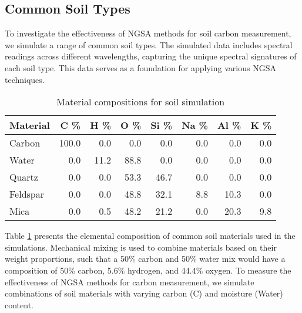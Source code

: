\subsection{Common Soil Types}

To investigate the effectiveness of NGSA methods for soil carbon measurement, we simulate a range of common soil types. The simulated data includes spectral readings across different wavelengths, capturing the unique spectral signatures of each soil type. This data serves as a foundation for applying various NGSA techniques.

\begin{table}[H]
\centering
\caption{Material compositions for soil simulation}
\label{tab:materials}
\begin{tabular}{lrrrrrrr}
\hline
 Material   &   C \% &   H \% &   O \% &   Si \% &   Na \% &   Al \% &   K \% \\
\hline
 Carbon     & 100.0 &   0.0 &   0.0 &    0.0 &    0.0 &    0.0 &   0.0 \\
 Water      &   0.0 &  11.2 &  88.8 &    0.0 &    0.0 &    0.0 &   0.0 \\
 Quartz     &   0.0 &   0.0 &  53.3 &   46.7 &    0.0 &    0.0 &   0.0 \\
 Feldspar   &   0.0 &   0.0 &  48.8 &   32.1 &    8.8 &   10.3 &   0.0 \\
 Mica       &   0.0 &   0.5 &  48.2 &   21.2 &    0.0 &   20.3 &   9.8 \\
\hline
\end{tabular}
\end{table}

Table \ref{tab:materials} presents the elemental composition of common soil materials used in the simulations. Mechanical mixing is used to combine materials based on their weight proportions, such that a 50\% carbon and 50\% water mix would have a composition of 50\% carbon, 5.6\% hydrogen, and 44.4\% oxygen. To measure the effectiveness of NGSA methods for carbon measurement, we simulate combinations of soil materials with varying carbon (C) and moisture (Water) content.